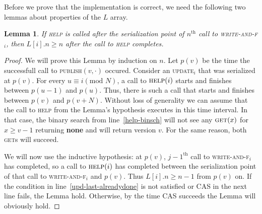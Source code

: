 \documentclass[a4paper,11pt]{article}
\def\none{\textbf{none} }
\newtheorem{lemma}{Lemma}
\newcommand{\fn}[1]{\textsc{#1}}
\begin{document}
Before we prove that the implementation is correct, we need the following two lemmas about properties of the $L$ array.

\begin{lemma}
	If \fn{help} is called after the serialization point of $n^{\text{th}}$ call to \fn{write-and-f$_i$}, then $L[i].n \geq n$ after the call to \fn{help} completes. \label{last-is-complete}
\end{lemma}
\begin{proof}
	We will prove this Lemma by induction on $n$. Let $p(v)$ be the time the successfull call to \fn{publish}$(v, \cdot)$ occured. Consider an \fn{update$_i$} that was serialized at $p(v)$.
	For every $u \equiv i \left(\mbox{mod } N\right)$, a call to $\fn{help}(i)$ starts and finishes between $p(u-1)$ and $p(u)$. Thus, there is such a call that starts and finishes between $p(v)$ and $p(v+N)$.
	Without loss of generality we can assume that the call to \fn{help} from the Lemma's hypothesis executes in this time interval. In that case, the binary search from line~\ref{help-binsch} will not see any
	$\fn{get}(x)$ for $x \geq v-1$ returning \none and will	return version $v$. For the same reason, both \fn{get}s will succeed.

	We will now use the inductive hypothesis: at $p(v)$, $j-1^{\text{th}}$ call to \fn{write-and-f$_i$} has completed, so a call to $\fn{help}(i)$ has completed between the serialization point of that call to \fn{write-and-f$_i$}
	and $p(v)$. Thus $L[i].n \geq n-1$ from $p(v)$ on. If the condition in line~\ref{upd-last-alreadydone} is not satisfied or CAS in the next line fails, the Lemma hold.
	Otherwise, by the time CAS succeeds the Lemma will obviously hold.
	
\end{proof}
\end{document}
